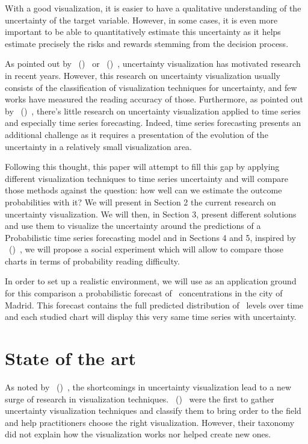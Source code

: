 \documentclass[a4paper,3p,sort&compress]{elsarticle}
\DeclareRobustCommand{\citeextp}[1]{\citeauthor{#1}~(\citeyear{#1})~\cite{#1}}
\begin{document}
With a good visualization, it is easier to have a qualitative understanding of
the uncertainty of the target variable. However, in some cases, it is even more
important to be able to quantitatively estimate this uncertainty as it helps
estimate precisely the risks and rewards stemming from the decision process.

As pointed out by \citeextp{weiskopf_uncertainty_2022} or 
\citeextp{padilla_uncertainty_2021}, uncertainty visualization has motivated
research in recent years. However, this research on uncertainty visualization
usually consists of the classification of visualization techniques for
uncertainty, and few works have measured the reading accuracy of those.
Furthermore, as pointed out by \citeextp{leffrang_should_2021},
there's little research on uncertainty visualization applied to time series and
especially time series forecasting. Indeed, time series forecasting presents an
additional challenge as it requires a presentation of the evolution of the
uncertainty in a relatively small visualization area.

Following this thought, this paper will attempt to fill this gap by applying
different visualization techniques to time series uncertainty and will compare
those methods against the question: how well can we estimate the outcome
probabilities with it? We will present in Section 2 the current research on
uncertainty visualization. We will then, in Section 3, present different
solutions and use them to visualize the uncertainty around the predictions of a
Probabilistic time series forecasting model and in Sections 4 and 5, inspired by
\citeextp{brennen_instrument_2018}, we will propose a social
experiment which will allow to compare those charts in terms of probability
reading difficulty.

In order to set up a realistic environment, we will use as an application ground
for this comparison a probabilistic forecast of \no~concentrations in the city
of Madrid. This forecast contains the full predicted distribution of \no~levels
over time and each studied chart will display this very same time series with
uncertainty.

\section{State of the art}
\label{sec:results}

As noted by \citeextp{joslyn_communicating_2010}, the shortcomings in
uncertainty visualization lead to a new surge of research in visualization
techniques. \citeextp{pang_approaches_1997} were the first to gather
uncertainty visualization techniques and classify them to bring order to the
field and help practitioners choose the right visualization. However, their
taxonomy did not explain how the visualization works nor helped create new ones.
\end{document}
